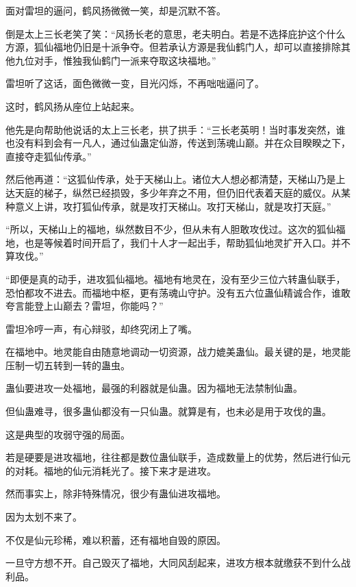 
\begin{this_body}



面对雷坦的逼问，鹤风扬微微一笑，却是沉默不答。

倒是太上三长老笑了笑：“风扬长老的意思，老夫明白。若是不选择庇护这个什么方源，狐仙福地仍旧是十派争夺。但若承认方源是我仙鹤门人，却可以直接排除其他九位对手，惟独我仙鹤门一派来夺取这块福地。”

雷坦听了这话，面色微微一变，目光闪烁，不再咄咄逼问了。

这时，鹤风扬从座位上站起来。

他先是向帮助他说话的太上三长老，拱了拱手：“三长老英明！当时事发突然，谁也没有料到会有一凡人，通过仙蛊定仙游，传送到荡魂山巅。并在众目睽睽之下，直接夺走狐仙传承。”

然后他再道：“这狐仙传承，处于天梯山上。诸位大人想必都清楚，天梯山乃是上达天庭的梯子，纵然已经损毁，多少年弃之不用，但仍旧代表着天庭的威仪。从某种意义上讲，攻打狐仙传承，就是攻打天梯山。攻打天梯山，就是攻打天庭。”

“所以，天梯山上的福地，纵然数目不少，但从未有人胆敢攻伐过。这次的狐仙福地，也是等候着时间开启了，我们十人才一起出手，帮助狐仙地灵扩开入口。并不算攻伐。”

“即便是真的动手，进攻狐仙福地。福地有地灵在，没有至少三位六转蛊仙联手，恐怕都攻不进去。而福地中枢，更有荡魂山守护。没有五六位蛊仙精诚合作，谁敢夸言能登上山巅去？雷坦，你能吗？”

雷坦冷哼一声，有心辩驳，却终究闭上了嘴。

在福地中。地灵能自由随意地调动一切资源，战力媲美蛊仙。最关键的是，地灵能压制一切五转到一转的蛊虫。

蛊仙要进攻一处福地，最强的利器就是仙蛊。因为福地无法禁制仙蛊。

但仙蛊难寻，很多蛊仙都没有一只仙蛊。就算是有，也未必是用于攻伐的蛊。

这是典型的攻弱守强的局面。

若是硬要是进攻福地，往往都是数位蛊仙联手，造成数量上的优势，然后进行仙元的对耗。福地的仙元消耗光了。接下来才是进攻。

然而事实上，除非特殊情况，很少有蛊仙进攻福地。

因为太划不来了。

不仅是仙元珍稀，难以积蓄，还有福地自毁的原因。

一旦守方想不开。自己毁灭了福地，大同风刮起来，进攻方根本就缴获不到什么战利品。


\end{this_body}
